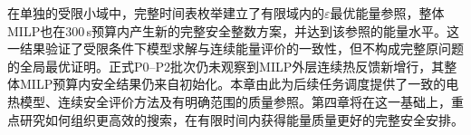 在单独的受限小域中，完整时间表枚举建立了有限域内的$\varepsilon$最优能量参照，整体MILP也在300\,s预算内产生新的完整安全整数方案，并达到该参照的能量水平。这一结果验证了受限条件下模型求解与连续能量评价的一致性，但不构成完整原问题的全局最优证明。正式P0--P2批次仍未观察到MILP外层连续热反馈新增行，其整体MILP预算内安全结果仍来自初始化。本章由此为后续任务调度提供了一致的电热模型、连续安全评价方法及有明确范围的质量参照。第四章将在这一基础上，重点研究如何组织更高效的搜索，在有限时间内获得能量质量更好的完整安全安排。




